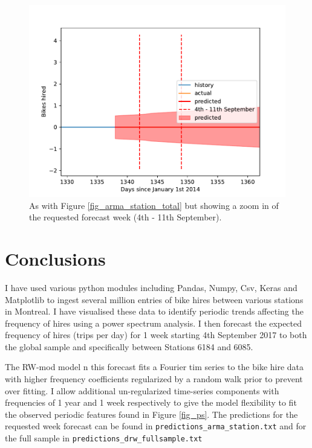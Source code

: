 \documentclass[10pt]{article}
\begin{document}
\begin{figure}
\includegraphics[scale=1.0,angle=0,trim=0cm 0cm 0cm 0cm]{arma_specstat_zoom.pdf}
\caption{As with Figure \ref{fig_arma_station_total} but showing a zoom in of the requested forecast week (4th - 11th September).}
\label{fig_arma_station_zoom}
\end{figure}






\section{Conclusions}
I have used various python modules including Pandas, Numpy, Csv, Keras and Matplotlib to ingest several million entries of bike hires between various stations in Montreal. I have visualised these data to identify periodic trends affecting the frequency of hires using a power spectrum analysis. I then forecast the expected frequency of hires (trips per day) for 1 week starting 4th September 2017 to both the global sample and specifically between Stations 6184 and 6085.

The RW-mod model n this forecast fits a Fourier tim series to the bike hire data with higher frequency coefficients regularized by a random walk prior to prevent over fitting. I allow additional un-regularized time-series components with frequencies of 1 year and 1 week respectively to give the model flexibility to fit the observed periodic features found in Figure \ref{fig_ps}. The predictions for the requested week forecast can be found in \verb|predictions_arma_station.txt| and for the full sample in \verb|predictions_drw_fullsample.txt|
\end{document}
